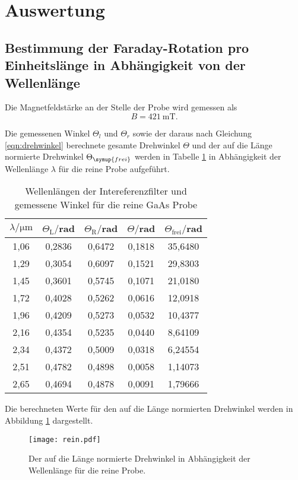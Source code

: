 \section{Auswertung}
\label{sec:Auswertung}
\subsection{Bestimmung der Faraday-Rotation pro Einheitslänge in Abhängigkeit von der Wellenlänge}
Die Magnetfeldstärke an der Stelle der Probe wird gemessen als
\begin{equation*}
  B = \SI{421}{\milli\tesla}.
\end{equation*}

Die gemessenen Winkel $\Theta_l$ und $\Theta_r$ sowie der daraus nach Gleichung
\ref{eqn:drehwinkel} berechnete gesamte Drehwinkel $\Theta$ und der auf die Länge
normierte Drehwinkel $\Theta_\symup{frei}$ werden in Tabelle \ref{tab:rein} in Abhängigkeit
der Wellenlänge $\lambda$ für die reine Probe aufgeführt.

\begin{table}[H]
  \centering
  \caption{Wellenlängen der Intereferenzfilter und gemessene Winkel für die reine GaAs Probe}
  \label{tab:rein}
  \begin{tabular}{c c c c c}
    \toprule
    $\lambda/\mathrm{\mu m}$ & $\Theta_{\mathrm{L}}/$rad & $\Theta_{\mathrm{R}}/$rad  & $\Theta /$rad & $\Theta_{\mathrm{frei}}/$rad\\
    \midrule
    1,06  & 0,2836 & 0,6472 & 0,1818 & 35,6480 \\
    1,29  & 0,3054 & 0,6097 & 0,1521 & 29,8303 \\
    1,45  & 0,3601 & 0,5745 & 0,1071 & 21,0180 \\
    1,72  & 0,4028 & 0,5262 & 0,0616 & 12,0918 \\
    1,96  & 0,4209 & 0,5273 & 0,0532 & 10,4377 \\
    2,16  & 0,4354 & 0,5235 & 0,0440 & 8,64109 \\
    2,34  & 0,4372 & 0,5009 & 0,0318 & 6,24554 \\
    2,51  & 0,4782 & 0,4898 & 0,0058 & 1,14073 \\
    2,65  & 0,4694 & 0,4878 & 0,0091 & 1,79666 \\
    \bottomrule
  \end{tabular}
\end{table}



Die berechneten Werte für den auf die Länge normierten Drehwinkel werden
in Abbildung \ref{fig:rein} dargestellt.
\begin{figure}[H]
  \centering
  \texttt{[image: rein.pdf]}
  \caption{Der auf die Länge normierte Drehwinkel in Abhängigkeit der Wellenlänge für die reine Probe.}
  \label{fig:rein}
\end{figure}

